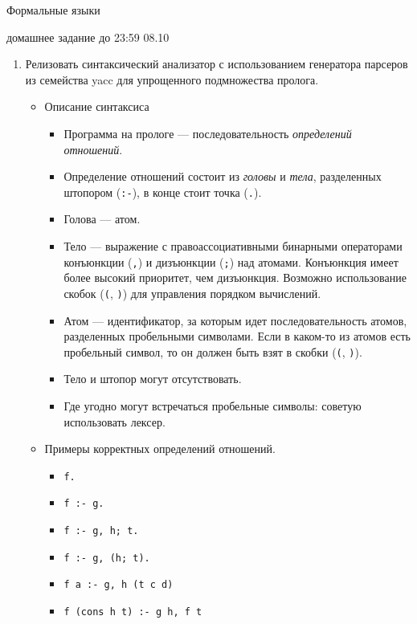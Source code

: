 \documentclass[12pt]{article}
\begin{document}
\begin{center} {\LARGE Формальные языки} \end{center}

\begin{center} \Large домашнее задание до 23:59 08.10 \end{center}
\bigskip

\begin{enumerate}
  \item
  {
    Релизовать синтаксический анализатор с использованием генератора парсеров из семейства yacc для упрощенного подмножества пролога.
    \begin{itemize}
      \item Описание синтаксиса
      \begin{itemize}
        \item Программа на прологе --- последовательность \emph{определений отношений}.
        \item Определение отношений состоит из \emph{головы} и \emph{тела}, разделенных штопором (\verb!:-!), в конце стоит точка (\verb!.!).
        \item Голова --- атом.
        \item Тело --- выражение с правоассоциативными бинарными операторами конъюнкции (\verb!,!) и дизъюнкции (\verb!;!) над атомами. Конъюнкция имеет более высокий приоритет, чем дизъюнкция. Возможно использование скобок (\verb!(!, \verb!)!) для управления порядком вычислений.
        \item Атом --- идентификатор, за которым идет последовательность атомов, разделенных пробельными символами. Если в каком-то из атомов есть пробельный символ, то он должен быть взят в скобки (\verb!(!, \verb!)!).
        \item Тело и штопор могут отсутствовать.
        \item Где угодно могут встречаться пробельные символы: советую использовать лексер.
      \end{itemize}
      \item Примеры корректных определений отношений.
      \begin{itemize}
        \item \verb!f.!
        \item \verb!f :- g.!
        \item \verb!f :- g, h; t.!
        \item \verb!f :- g, (h; t).!
        \item \verb!f a :- g, h (t c d)!
        \item \verb!f (cons h t) :- g h, f t!

\end{itemize}
\end{itemize}}
\end{enumerate}
\end{document}
